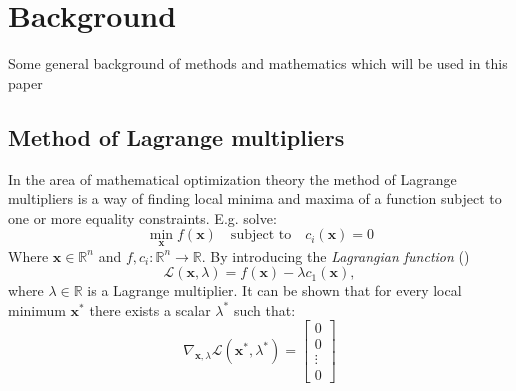 
\chapter{Background}
%
Some general background of methods and mathematics which will be used in this paper
%
\section{Method of Lagrange multipliers}
%
In the area of mathematical optimization theory the method of Lagrange multipliers is 
a way of finding local minima and maxima of a function subject to one or more equality 
constraints. E.g. solve:
%
\begin{equation}
\min_{\textbf{x}} f(\textbf{x}) \quad \text{subject to} \quad  c_i(\textbf{x}) = 0
\label{lagrangeEx}
\end{equation}
%
Where $\textbf{x} \in \mathbb{R}^n $ and $f,c_i : \mathbb{R}^n \rightarrow \mathbb{R} $.
By introducing the \textit{Lagrangian function} (\cite{Nocedal_Wright})
%
\begin{equation}
\mathcal{L} (\textbf{x}, \lambda) = f(\textbf{x}) - \lambda c_1(\textbf{x}),
\label{lagrangian}
\end{equation}
%
where $\lambda \in \mathbb{R}$ is a Lagrange multiplier. It can be shown that for every 
local minimum $\textbf{x}^*$ there exists a scalar $\lambda^*$ such that:
%
\begin{equation}
\nabla_{\textbf{x}, \lambda} \mathcal{L} (\textbf{x}^*, \lambda^*) = 
\begin{bmatrix}
	0 \\
	0 \\
	\vdots \\
    0   
\end{bmatrix}
\label{optimumNecessary}
\end{equation}
%
